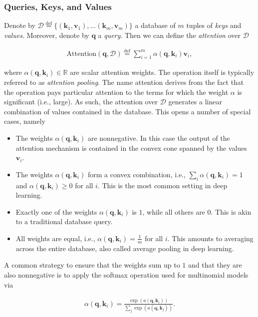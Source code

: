 \documentclass[a4paper,12pt]{article}
\theoremstyle{definition}
\begin{document}
\subsubsection*{Queries, Keys, and Values}
Denote by $\mathcal{D} \stackrel{\mathrm{def}}{=} \{(\mathbf{k}_1, \mathbf{v}_1), \ldots (\mathbf{k}_m, \mathbf{v}_m)\}$ a database of $m$ tuples of \emph{keys} and \emph{values}.
Moreover, denote by $\mathbf{q}$ a \emph{query}. Then we can define the \emph{attention} over $\mathcal{D}$

\begin{align*}
    \mathrm{Attention}(\mathbf{q}, \mathcal{D}) \stackrel{\mathrm{def}}{=} \sum_{i=1}^m \alpha(\mathbf{q}, \mathbf{k}_i) \mathbf{v}_i,
\end{align*}

where $\alpha(\mathbf{q}, \mathbf{k}_i) \in \mathbb{R}$ are scalar attention weights. The operation itself is typically referred to as \emph{attention pooling}.
The name attention derives from the fact that the operation pays particular attention to the terms for which the weight $\alpha$ is significant (i.e., large).
As such, the attention over $\mathcal{D}$ generates a linear combination of values contained in the database. This opens a number of special cases, namely
\begin{itemize}
    \item The weights $\alpha(\mathbf{q}, \mathbf{k}_i)$ are nonnegative. In this case the output of the attention mechanism is contained in the convex cone spanned by the values $\mathbf{v}_i$.
    \item The weights $\alpha(\mathbf{q}, \mathbf{k}_i)$ form a convex combination, i.e., $\sum_i \alpha(\mathbf{q}, \mathbf{k}_i) = 1$ and $\alpha(\mathbf{q}, \mathbf{k}_i) \geq 0$ for all $i$.
          This is the most common setting in deep learning.
    \item Exactly one of the weights $\alpha(\mathbf{q}, \mathbf{k}_i)$ is $1$, while all others are $0$. This is akin to a traditional database query.
    \item All weights are equal, i.e., $\alpha(\mathbf{q}, \mathbf{k}_i) = \frac{1}{m}$ for all $i$. This amounts to averaging across the entire database, also called average pooling in deep learning.
\end{itemize}
A common strategy to ensure that the weights sum up to $1$ and that they are also nonnegative is to apply the softmax operation used for multinomial models via

\begin{align*}
    \alpha(\mathbf{q}, \mathbf{k}_i) = \frac{\exp(a(\mathbf{q}, \mathbf{k}_i))}{\sum_j \exp(a(\mathbf{q}, \mathbf{k}_j))}.
\end{align*}
\end{document}
